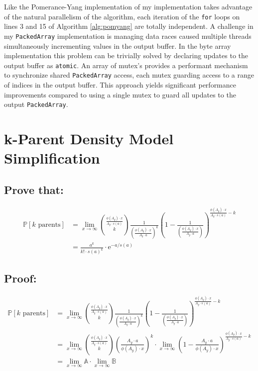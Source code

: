 \documentclass{article}
\theoremstyle{definition}
\begin{document}
Like the Pomerance-Yang implementation of \cite{chum_guy_jacobson_mosunov_2018} my implementation takes advantage of the natural parallelism of the algorithm, each iteration of the \texttt{for} loops on lines 3 and 15 of Algorithm \ref{alg:pomyang} are totally independent. A challenge in my \texttt{PackedArray} implementation is managing data races caused multiple threads simultaneously incrementing values in the output buffer. In the byte array implementation this problem can be trivially solved by declaring updates to the output buffer as \texttt{atomic}. An array of mutex's provides a performant mechanism to synchronize shared \texttt{PackedArray} access, each mutex guarding access to a range of indices in the output buffer. This approach yields significant performance improvements compared to using a single mutex to guard all updates to the output \texttt{PackedArray}.   

\appendix
\section{k-Parent Density Model Simplification}
\subsection*{Prove that:}
\begin{align*}
    \mathbb{P}[k \text{ parents}] & =  \lim_{x \to \infty}{\frac{\phi(A_y) \cdot x}{A_y \cdot s(a)} \choose k } \frac{1}{\left(\frac{\phi(A_y) \cdot x}{ A_y \cdot a}\right)^k} \left(1- \frac{1}{\left(\frac{\phi(A_y) \cdot x}{ A_y \cdot a}\right)}\right)^{\frac{\phi(A_y) \cdot x}{A_y \cdot s(a)  } -k} \\
                                  & = \frac{a^{k}}{k! \cdot s(a)^k} \cdot \text{e}^{-a/s(a)}
\end{align*}

\subsection*{Proof:} \begin{align*}
    \mathbb{P}[k \text{ parents}] & =  \lim_{x \to \infty}{\frac{\phi(A_y) \cdot x}{A_y \cdot s(a)} \choose k } \frac{1}{\left(\frac{\phi(A_y) \cdot x}{ A_y \cdot a}\right)^k} \left(1- \frac{1}{\left(\frac{\phi(A_y) \cdot x}{ A_y \cdot a}\right)}\right)^{\frac{\phi(A_y) \cdot x}{A_y \cdot s(a)  } -k} \\
                                  & =  \lim_{x \to \infty}{\frac{\phi(A_y) \cdot x}{A_y \cdot s(a)} \choose k } \left(\frac{A_y \cdot a}{\phi(A_y) \cdot x}\right)^k \cdot \lim_{x \to \infty}\left(1- \frac{A_y \cdot a}{\phi(A_y) \cdot x}\right)^{\frac{\phi(A_y) \cdot x}{A_y \cdot s(a)  } -k}           \\
                                  & =  \lim_{x \to \infty}\mathbb{A}  \cdot \lim_{x \to \infty} \mathbb{B}
\end{align*}
\end{document}
